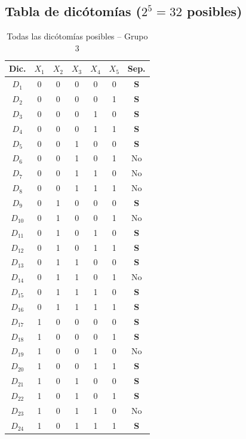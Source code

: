 \documentclass[12pt,a4paper]{article}
\begin{document}
\subsection{Tabla de dic\'otom\'ias ($2^{5}=32$ posibles)}
\begin{table}[H]\centering
  \caption{Todas las dic\'otom\'ias posibles -- Grupo 3}
  \begin{tabular}{ccccccc}\toprule
    \textbf{Dic.} & $X_{1}$ & $X_{2}$ & $X_{3}$ & $X_{4}$ & $X_{5}$ & \textbf{Sep.}\\\midrule
    $D_{1}$ & 0 & 0 & 0 & 0 & 0 & \textbf{S} \\
    $D_{2}$ & 0 & 0 & 0 & 0 & 1 & \textbf{S} \\
    $D_{3}$ & 0 & 0 & 0 & 1 & 0 & \textbf{S} \\
    $D_{4}$ & 0 & 0 & 0 & 1 & 1 & \textbf{S} \\
    $D_{5}$ & 0 & 0 & 1 & 0 & 0 & \textbf{S} \\
    $D_{6}$ & 0 & 0 & 1 & 0 & 1 & No \\
    $D_{7}$ & 0 & 0 & 1 & 1 & 0 & No \\
    $D_{8}$ & 0 & 0 & 1 & 1 & 1 & No \\
    $D_{9}$ & 0 & 1 & 0 & 0 & 0 & \textbf{S} \\
    $D_{10}$ & 0 & 1 & 0 & 0 & 1 & No \\
    $D_{11}$ & 0 & 1 & 0 & 1 & 0 & \textbf{S} \\
    $D_{12}$ & 0 & 1 & 0 & 1 & 1 & \textbf{S} \\
    $D_{13}$ & 0 & 1 & 1 & 0 & 0 & \textbf{S} \\
    $D_{14}$ & 0 & 1 & 1 & 0 & 1 & No \\
    $D_{15}$ & 0 & 1 & 1 & 1 & 0 & \textbf{S} \\
    $D_{16}$ & 0 & 1 & 1 & 1 & 1 & \textbf{S} \\
    $D_{17}$ & 1 & 0 & 0 & 0 & 0 & \textbf{S} \\
    $D_{18}$ & 1 & 0 & 0 & 0 & 1 & \textbf{S} \\
    $D_{19}$ & 1 & 0 & 0 & 1 & 0 & No \\
    $D_{20}$ & 1 & 0 & 0 & 1 & 1 & \textbf{S} \\
    $D_{21}$ & 1 & 0 & 1 & 0 & 0 & \textbf{S} \\
    $D_{22}$ & 1 & 0 & 1 & 0 & 1 & \textbf{S} \\
    $D_{23}$ & 1 & 0 & 1 & 1 & 0 & No \\
    $D_{24}$ & 1 & 0 & 1 & 1 & 1 & \textbf{S} \\

\end{tabular}
\end{table}
\end{document}
